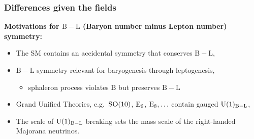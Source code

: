 \documentclass[10pt,xcolor=dvipsnames,mathserif]{beamer}
\begin{document}
	\begin{frame}
	
	\frametitle{Differences given the fields}
	
	\textbf{Motivations for $\bm{\mathrm{B-L}}$ (Baryon number minus Lepton number) symmetry:}
	\vskip5mm
	\begin{itemize}
		\item The SM contains an accidental symmetry that conserves $\mathrm{B-L}$,
		\vskip2mm
		\item $\mathrm{B-L}$ symmetry relevant for baryogenesis through leptogenesis,
		\begin{itemize}
			\item sphaleron process violates $\mathrm{B}$ but preserves $\mathrm{B-L}$
		\end{itemize}  
		\item Grand Unified Theories, e.g.~$\mathrm{SO}(10)_{\mathrm{}}$, $\mathrm{E}_{6}$, $\mathrm{E}_{8},\ldots$ contain gauged $\mathrm{U}(1)_{\mathrm{B-L}}$,
		\item The scale of $\mathrm{U}(1)_{\mathrm{B-L}}$ breaking sets the mass scale of the right-handed Majorana neutrinos.
	\end{itemize}
	
	\end{frame}
	
\end{document}
